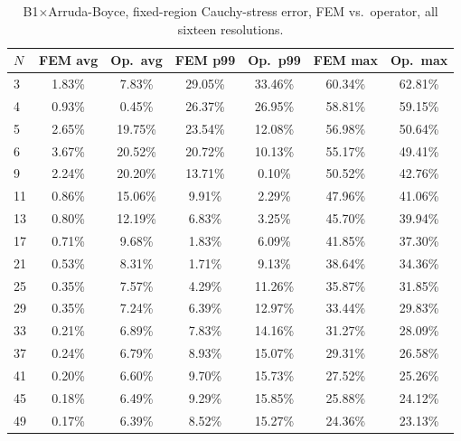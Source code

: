 \documentclass[11pt]{article}
\begin{document}
\begin{table}[h]
\centering
\caption{B1$\times$Arruda-Boyce, fixed-region Cauchy-stress error, FEM
  vs.\ operator, all sixteen resolutions.}
\label{tab:s2-b1ab-b}
\scriptsize
\begin{tabular}{lcccccc}
\toprule
$N$ & FEM avg & Op.\ avg & FEM p99 & Op.\ p99 & FEM max & Op.\ max \\
\midrule
3  & 1.83\% & 7.83\%  & 29.05\% & 33.46\% & 60.34\% & 62.81\% \\
4  & 0.93\% & 0.45\%  & 26.37\% & 26.95\% & 58.81\% & 59.15\% \\
5  & 2.65\% & 19.75\% & 23.54\% & 12.08\% & 56.98\% & 50.64\% \\
6  & 3.67\% & 20.52\% & 20.72\% & 10.13\% & 55.17\% & 49.41\% \\
9  & 2.24\% & 20.20\% & 13.71\% & 0.10\%  & 50.52\% & 42.76\% \\
11 & 0.86\% & 15.06\% & 9.91\%  & 2.29\%  & 47.96\% & 41.06\% \\
13 & 0.80\% & 12.19\% & 6.83\%  & 3.25\%  & 45.70\% & 39.94\% \\
17 & 0.71\% & 9.68\%  & 1.83\%  & 6.09\%  & 41.85\% & 37.30\% \\
21 & 0.53\% & 8.31\%  & 1.71\%  & 9.13\%  & 38.64\% & 34.36\% \\
25 & 0.35\% & 7.57\%  & 4.29\%  & 11.26\% & 35.87\% & 31.85\% \\
29 & 0.35\% & 7.24\%  & 6.39\%  & 12.97\% & 33.44\% & 29.83\% \\
33 & 0.21\% & 6.89\%  & 7.83\%  & 14.16\% & 31.27\% & 28.09\% \\
37 & 0.24\% & 6.79\%  & 8.93\%  & 15.07\% & 29.31\% & 26.58\% \\
41 & 0.20\% & 6.60\%  & 9.70\%  & 15.73\% & 27.52\% & 25.26\% \\
45 & 0.18\% & 6.49\%  & 9.29\%  & 15.85\% & 25.88\% & 24.12\% \\
49 & 0.17\% & 6.39\%  & 8.52\%  & 15.27\% & 24.36\% & 23.13\% \\
\bottomrule
\end{tabular}
\end{table}
\end{document}
